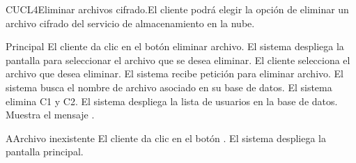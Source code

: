 
\begin{UseCase}{CUCL4}{Eliminar archivos cifrado.}{El cliente podrá elegir la opción de eliminar un archivo cifrado del servicio de almacenamiento en la nube.}

\end{UseCase}


\begin{UCtrayectoria}{Principal}
	\UCpaso [\UCactor] El cliente da clic en el botón eliminar archivo.
	\UCpaso  El sistema despliega la pantalla para seleccionar el archivo que se desea eliminar.
	\UCpaso [\UCactor] El cliente selecciona el archivo que desea eliminar.
	\UCpaso  El sistema recibe petición para eliminar archivo.
	\UCpaso  El sistema busca el nombre de archivo asociado en su base de datos.
	\UCpaso  El sistema elimina C1 y C2.
	\UCpaso  El sistema despliega la lista de usuarios en la base de datos.
	\UCpaso Muestra el mensaje .\end{UCtrayectoria}

\begin{UCtrayectoriaA}{A}{Archivo inexistente}
	\UCpaso [\UCactor] El cliente da clic en el botón \IUbuttonAceptar.
	\UCpaso El sistema despliega la pantalla principal.
\end{UCtrayectoriaA}
